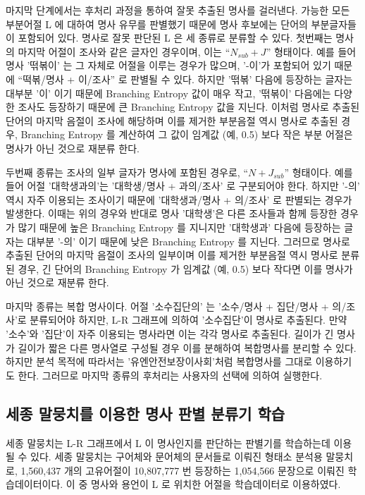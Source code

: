 \documentclass[oneside, ko,phd]{snuthesis_utf8_kor}
\begin{document}
마지막 단계에서는 후처리 과정을 통하여 잘못 추출된 명사를 걸러낸다.
가능한 모든 부분어절 L 에 대하여 명사 유무를 판별했기 때문에 명사 후보에는 단어의 부분글자들이 포함되어 있다.
명사로 잘못 판단된 L 은 세 종류로 분류할 수 있다.
첫번째는 명사의 마지막 어절이 조사와 같은 글자인 경우이며, 이는 “$N_{sub} + J$” 형태이다.
예를 들어 명사 '떢볶이' 는 그 자체로 어절을 이루는 경우가 많으며, '-이'가 포함되어 있기 때문에 “떡볶/명사 + 이/조사” 로 판별될 수 있다.
하지만 '떢볶' 다음에 등장하는 글자는 대부분 '이' 이기 때문에 Branching Entropy 값이 매우 작고, '떢볶이' 다음에는 다양한 조사도 등장하기 때문에 큰 Branching Entropy 값을 지닌다.
이처럼 명사로 추출된 단어의 마지막 음절이 조사에 해당하며 이를 제거한 부분음절 역시 명사로 추출된 경우, Branching Entropy 를 계산하여 그 값이 임계값 (예, 0.5) 보다 작은 부분 어절은 명사가 아닌 것으로 재분류 한다.

두번째 종류는 조사의 일부 글자가 명사에 포함된 경우로, “$N + J_{sub}$” 형태이다.
예를 들어 어절 '대학생과의'는 '대학생/명사 + 과의/조사' 로 구분되어야 한다.
하지만 '-의' 역시 자주 이용되는 조사이기 때문에 '대학생과/명사 + 의/조사' 로 판별되는 경우가 발생한다.
이때는 위의 경우와 반대로 명사 '대학생'은 다른 조사들과 함께 등장한 경우가 많기 때문에 높은 Branching Entropy 를 지니지만 '대학생과' 다음에 등장하는 글자는 대부분 '-의' 이기 때문에 낮은 Branching Entropy 를 지닌다.
그러므로 명사로 추출된 단어의 마지막 음절이 조사의 일부이며 이를 제거한 부분음절 역시 명사로 분류된 경우, 긴 단어의 Branching Entropy 가 임계값 (예, 0.5) 보다 작다면 이를 명사가 아닌 것으로 재분류 한다.

마지막 종류는 복합 명사이다.
어절 '소수집단의' 는 '소수/명사 + 집단/명사 + 의/조사'로 분류되어야 하지만, L-R 그래프에 의하여 '소수집단'이 명사로 추출된다.
만약 '소수'와 '집단'이 자주 이용되는 명사라면 이는 각각 명사로 추출된다.
길이가 긴 명사가 길이가 짧은 다른 명사열로 구성될 경우 이를 분해하여 복합명사를 분리할 수 있다.
하지만 분석 목적에 따라서는 '유엔안전보장이사회'처럼 복합명사를 그대로 이용하기도 한다.
그러므로 마지막 종류의 후처리는 사용자의 선택에 의하여 실행한다.

\subsection{세종 말뭉치를 이용한 명사 판별 분류기 학습}

세종 말뭉치는 L-R 그래프에서 L 이 명사인지를 판단하는 판별기를 학습하는데 이용될 수 있다.
세종 말뭉치는 구어체와 문어체의 문서들로 이뤄진 형태소 분석용 말뭉치로, 1,560,437 개의 고유어절이 10,807,777 번 등장하는 1,054,566 문장으로 이뤄진 학습데이터이다.
이 중 명사와 용언이 L 로 위치한 어절을 학습데이터로 이용하였다.
\end{document}
